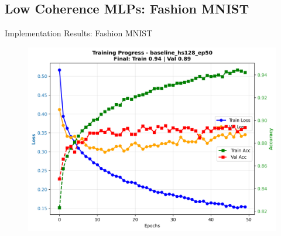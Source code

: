 \documentclass[9pt,dvipsnames]{beamer}
\begin{document}
\subsection{Low Coherence MLPs: Fashion MNIST}
\begin{frame}{Implementation Results: Fashion MNIST}

    
    \begin{figure}[H]
        \centering
        \begin{minipage}[b]{0.48\textwidth}
            \centering
            \includegraphics[width=\textwidth]{../plots/mlp/fashion_mnist/hs128_ep50/baseline_hs128_ep50_training_curves.png}
            

\end{minipage}
\end{figure}
\end{frame}
\end{document}
